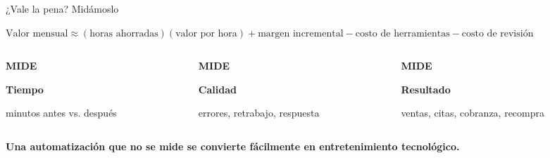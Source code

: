 \documentclass[aspectratio=169,11pt]{beamer}
\newcommand{\kicker}[1]{{\color{gold}\scriptsize\bfseries\MakeUppercase{#1}}}
\newcommand{\muted}[1]{{\color{muted}#1}}
\begin{document}
\begin{frame}{¿Vale la pena? Midámoslo}
\vspace{0.15cm}
\begin{center}
{\fontsize{20}{24}\selectfont
$\displaystyle \text{Valor mensual} \approx
(\text{horas ahorradas})(\text{valor por hora})
+ \text{margen incremental}
- \text{costo de herramientas}
- \text{costo de revisión}$}
\end{center}

\vspace{0.65cm}
\begin{columns}[T,onlytextwidth]
\begin{column}{0.30\textwidth}
\kicker{Mide}\par\vspace{0.12cm}
\textbf{Tiempo}\par
\small\muted{minutos antes vs. después}
\end{column}
\begin{column}{0.30\textwidth}
\kicker{Mide}\par\vspace{0.12cm}
\textbf{Calidad}\par
\small\muted{errores, retrabajo, respuesta}
\end{column}
\begin{column}{0.30\textwidth}
\kicker{Mide}\par\vspace{0.12cm}
\textbf{Resultado}\par
\small\muted{ventas, citas, cobranza, recompra}
\end{column}
\end{columns}

\vfill
{\color{forest}\bfseries Una automatización que no se mide se convierte fácilmente en entretenimiento tecnológico.}
\end{frame}
\end{document}
